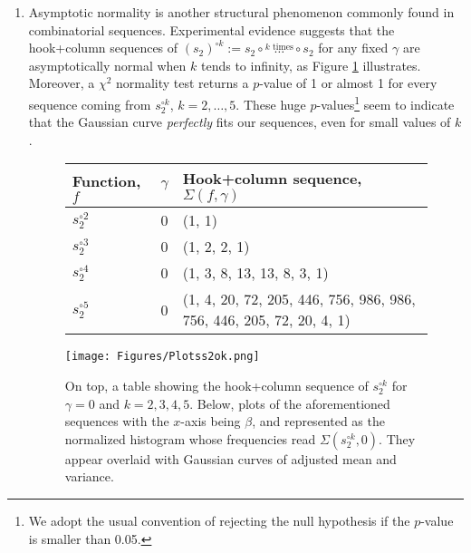 \documentclass[twoside]{article}
\begin{document}
\begin{enumerate}
The hook+column sequence $\Sigma(s_2^{\circ5},\gamma)$ appearing in Figure \ref{fig:normalidad} gives us an example of a 
hook+column sequence that is not log-concave.
However, is there a sensible renormalization of hook+column sequences arising from plethysm that renders them log-concave?

\item
Asymptotic normality is another structural phenomenon commonly found in combinatorial sequences. Experimental evidence suggests that the hook+column sequences of $(s_2)^{\circ k}:=s_2\circ \stackrel{k\text{ times}}{\ldots}\circ s_2$ for any fixed $\gamma$ are asymptotically normal when $k$ tends to infinity, as Figure \ref{fig:normalidad} illustrates. Moreover, a $\chi^2$ normality test returns a $p$-value of 1 or almost 1 for every sequence coming from $s_2^{\circ k}$, $k=2,\ldots,5$. These huge $p$-values\footnote{We adopt the usual convention of rejecting the null hypothesis if the $p$-value is smaller than 0.05.} seem to indicate that the Gaussian curve \emph{perfectly} fits our sequences, even for small values of $k$.

\begin{figure}[H]\label{table_normal}
    \centering
    \footnotesize %
    \begin{tabular}{  l | l | l }
                \toprule
                Function, $f$ & $\gamma$  & Hook+column sequence, $\Sigma(f, \gamma)$  \\ 
                \midrule
                $s_2^{\circ2}$ & 0 & (1, 1)\\
                $s_2^{\circ3}$ & 0 & (1, 2, 2, 1)\\
                $s_2^{\circ4}$ & 0 & (1, 3, 8, 13, 13, 8, 3, 1)\\
                $s_2^{\circ5}$ & 0 & (1, 4, 20, 72, 205, 446, 756, 986, 986, 756, 446, 205, 72, 20, 4, 1)\\
                \bottomrule
            \end{tabular}
        \texttt{[image: Figures/Plotss2ok.png]}
    \caption{On top, a table showing the hook+column sequence of $s_2^{\circ k}$ for $\gamma=0$ and $k=2,3,4,5$. Below, plots of the aforementioned sequences with the $x$-axis being $\beta$, and represented as the normalized histogram whose frequencies read $\Sigma(s_2^{\circ k}, 0)$. They appear overlaid with Gaussian curves of adjusted mean and variance.}
    \label{fig:normalidad}
\end{figure}


\end{enumerate}
\end{document}
